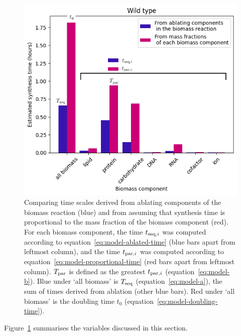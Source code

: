 \begin{figure}
  \centering
  \includegraphics[width=.9\linewidth]{ablation_example_adapted.png}
  \caption{
    Comparing time scales derived from ablating components of the biomass reaction (blue) and from assuming that synthesis time is proportional to the mass fraction of the biomass component (red).
    For each biomass component, the time $t_{\mathrm{seq},i}$ was computed according to equation~\ref{eq:model-ablated-time} (blue bars apart from leftmost column), and the time $t_{\mathrm{par},i}$ was computed according to equation~\ref{eq:model-proportional-time} (red bars apart from leftmost column).
    $T_{\mathrm{par}}$ is defined as the greatest $t_{\mathrm{par},i}$ (equation~\ref{eq:model-b}).
    Blue under `all biomass' is $T_{\mathrm{seq}}$ (equation~\ref{eq:model-a}), the sum of times derived from ablation (other blue bars).
    Red under `all biomass' is the doubling time $t_{0}$ (equation~\ref{eq:model-doubling-time}).
  }
  \label{fig:model-ablate-times}
\end{figure}

Figure~\ref{fig:model-ablate-times} summarises the variables discussed in this section.

